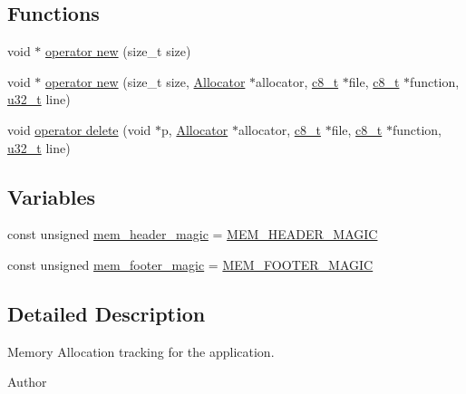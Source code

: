 \subsection*{Functions}
\begin{DoxyCompactItemize}
\item 
void $\ast$ \hyperlink{_allocator_8cc_a205ed048fdf5259c2e8e0cb60ee8f719}{operator new} (size\-\_\-t size)
\item 
void $\ast$ \hyperlink{_allocator_8cc_a63f35182ff333566e66717b5af850733}{operator new} (size\-\_\-t size, \hyperlink{class_allocator}{Allocator} $\ast$allocator, \hyperlink{types_8h_a93d4fa6fb79d31926edb1d51e2f502d2}{c8\-\_\-t} $\ast$file, \hyperlink{types_8h_a93d4fa6fb79d31926edb1d51e2f502d2}{c8\-\_\-t} $\ast$function, \hyperlink{types_8h_a0c0a490ab7fa397be6c764a935cc5ea4}{u32\-\_\-t} line)
\item 
void \hyperlink{_allocator_8cc_a1525b45390e2b112a1796d6eef1202d6}{operator delete} (void $\ast$p, \hyperlink{class_allocator}{Allocator} $\ast$allocator, \hyperlink{types_8h_a93d4fa6fb79d31926edb1d51e2f502d2}{c8\-\_\-t} $\ast$file, \hyperlink{types_8h_a93d4fa6fb79d31926edb1d51e2f502d2}{c8\-\_\-t} $\ast$function, \hyperlink{types_8h_a0c0a490ab7fa397be6c764a935cc5ea4}{u32\-\_\-t} line)
\end{DoxyCompactItemize}
\subsection*{Variables}
\begin{DoxyCompactItemize}
\item 
const unsigned \hyperlink{_allocator_8cc_ac870dbfc709df78d9ee713843f55e894}{mem\-\_\-header\-\_\-magic} = \hyperlink{_allocator_8cc_a2db6c9af5aa02be13a49f706da54385c}{M\-E\-M\-\_\-\-H\-E\-A\-D\-E\-R\-\_\-\-M\-A\-G\-I\-C}
\item 
const unsigned \hyperlink{_allocator_8cc_a89ab5016ef388d7a5691e4d77208cc32}{mem\-\_\-footer\-\_\-magic} = \hyperlink{_allocator_8cc_adb9b241eeb9083c288e77112c7e7b0a5}{M\-E\-M\-\_\-\-F\-O\-O\-T\-E\-R\-\_\-\-M\-A\-G\-I\-C}
\end{DoxyCompactItemize}


\subsection{Detailed Description}
Memory Allocation tracking for the application. \begin{DoxyAuthor}{Author}

\end{DoxyAuthor}


